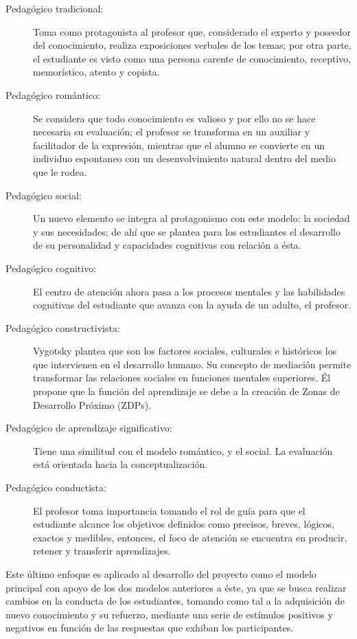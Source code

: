 \documentclass[12pt]{article} %
\begin{document}
\begin{description}
\item[Pedagógico tradicional:] Toma como protagonista al profesor que, considerado el experto y poseedor del conocimiento, realiza exposiciones verbales de los temas; por otra parte, el estudiante es visto como una persona carente de conocimiento, receptivo, memorístico, atento y copista.
\item[Pedagógico romántico:] Se considera que todo conocimiento es valioso y por ello no se hace necesaria su evaluación; el profesor se transforma en un auxiliar y facilitador de la expresión, mientras que el alumno se convierte en un individuo espontaneo con un desenvolvimiento natural dentro del medio que le rodea.
\item[Pedagógico social:] Un nuevo elemento se integra al protagonismo con este modelo: la sociedad y sus necesidades; de ahí que se plantea para los estudiantes el desarrollo de su personalidad y capacidades cognitivas con relación a ésta.
\item[Pedagógico cognitivo:] El centro de atención ahora pasa a los procesos mentales y las habilidades cognitivas del estudiante que avanza con la ayuda de un adulto, el profesor.
\item[Pedagógico constructivista:] Vygotsky plantea que son los factores sociales, culturales e históricos los que intervienen en el desarrollo humano. Su concepto de mediación permite transformar las relaciones sociales en funciones mentales superiores. Él propone que la función del aprendizaje se debe a la creación de Zonas de Desarrollo Próximo (ZDPs).
\item[Pedagógico de aprendizaje significativo:] Tiene una similitud con el modelo romántico, y el social. La evaluación está orientada hacia la conceptualización.
\item[Pedagógico conductista:] El profesor toma importancia tomando el rol de guía para que el estudiante alcance los objetivos definidos como precisos, breves, lógicos, exactos y medibles, entonces, el foco de atención se encuentra en producir, retener y transferir aprendizajes.
\end{description}
Este último enfoque es aplicado al desarrollo del proyecto como el modelo principal con apoyo de los dos modelos anteriores a éste, ya que se busca realizar cambios en la conducta de los estudiantes, tomando como tal a la adquisición de nuevo conocimiento y su refuerzo, mediante una serie de estímulos positivos y negativos en función de las respuestas que exhiban los participantes.\\
\end{document}

